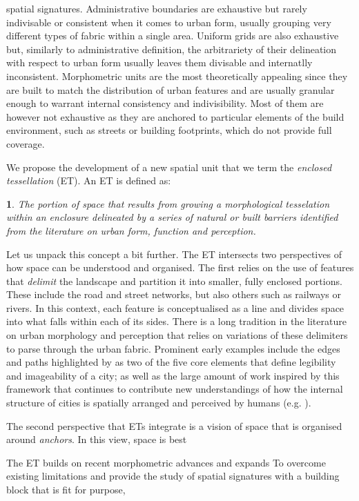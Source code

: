 spatial signatures.
%
Administrative boundaries are exhaustive but rarely indivisable or consistent
when it comes to urban form, usually grouping very different types of fabric
within a single area.
%
Uniform grids are also exhaustive but, similarly to administrative definition,
the arbitrariety of their delineation with respect to urban form usually
leaves them divisable and internatlly inconsistent.
%
Morphometric units are the most theoretically appealing since they are built
to match the distribution of urban features and are usually granular enough to
warrant internal consistency and indivisibility. Most of them are however not
exhaustive as they are anchored to particular elements of the build
environment, such as streets or building footprints, which do not provide full
coverage.

We propose the development of a new spatial unit that we term the
\textit{enclosed tessellation} (ET).
An ET is defined as:
\newtheorem*{theorem}{}
\begin{theorem}
        The portion of space that results from growing a
morphological tesselation within an
enclosure delineated by a series of natural or built barriers identified from the
literature on urban form, function and perception.
\end{theorem}
Let us unpack this concept a bit further. The ET intersects two perspectives
of how space can be understood and organised.
%
The first relies on the use of features that \textit{delimit} the landscape
and partition it into smaller, fully enclosed portions. These include the
road and street networks, but also others such as railways or rivers. In this context,
each feature is conceptualised as a line and divides space into what falls
within each of its sides.
%
There is a long tradition in the literature on urban morphology and perception
that relies on variations of these delimiters to parse through the urban
fabric. Prominent early examples include the edges and paths highlighted by
\cite{lynch1960} as two of the five core elements that define legibility and
imageability of a city; as well as the large amount of work inspired by this
framework that continues to contribute new understandings of how the internal
structure of cities is spatially arranged and perceived by humans (e.g.
\citealp{filomena2019a}).

The second perspective that ETs integrate is a vision of space that is organised
around \textit{anchors}. In this view, space is best 
 \citep{fleischmann2020morphological}
%



The ET builds on recent morphometric advances and expands
%
To overcome existing limitations and provide the study of spatial signatures
with a building block that is fit for purpose,


